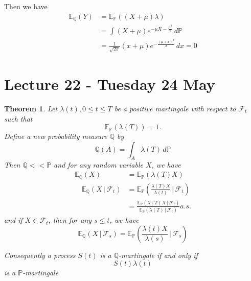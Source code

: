 \documentclass[10pt, oneside, reqno]{amsart}
\theoremstyle{plain}%
\newtheorem{thm}{Theorem}[section]
\theoremstyle{definition}
\theoremstyle{remark}
\newcommand{\given}{ \, | \,}
\newcommand{\Q}{\mathbb{Q}}
\renewcommand{\P}{\mathbb{P}}
\newcommand{\E}{\mathbb{E}}
\newcommand{\sigf}{\mathcal{F}}
\begin{document}
Then we have \begin{align*}
	\E_\Q(Y) &= \E_\P((X + \mu) \lambda) \\
			&= \int (X + \mu) e^{-\mu X - \frac{\mu^2}{2}} \, d\P \\
			&= \frac{1}{\sqrt{2 \pi}} (x + \mu) e^{- \frac{(\mu + x)^2}{2}} \, dx = 0
\end{align*}
\section{Lecture 22 - Tuesday 24 May} %
\label{sec:lecture_22_tuesday_24_may}

\begin{thm}
	Let $\lambda(t), 0 \leq t \leq T$ be a positive martingale with respect to $\sigf_t$ such that \[
		\E_\P(\lambda(T)) = 1.  
	\]  Define a new probability measure $\Q$ by \[
		\Q(A) = \int_A \lambda(T) \, d\P
	\]  Then $\Q << \P$ and for any random variable $X$, we have \begin{align*}
		\E_\Q(X) &= \E_\P(\lambda(T) X)\\
		 \quad \E_\Q(X \given \sigf_t) &= \E_\P \left( \frac{\lambda(T) X}{\lambda(t)} \given \sigf_t \right) \tag{$\star$} \\
		&= \frac{\E_\P(\lambda(T) X \given \sigf_t )}{\E_\P(\lambda(T) \given \sigf_t)}  a.s.	
	\end{align*}
	 and if $X \in \sigf_t$, then for any $s \leq t$, we have \[
		\E_\Q(X \given \sigf_s) = \E_\P \left( \frac{\lambda(t) X}{\lambda(s)} \given \sigf_s \right) \tag{$\star \star$}
	\]
	
	Consequently a process $S(t)$ is a $\Q$-martingale if and only if \[
		S(t) \lambda(t) \tag{$\dagger$}
	\] is a $\P$-martingale
\end{thm}
\newcommand{\indic}[1]{\mathbf{1}_{#1}}
\end{document}
